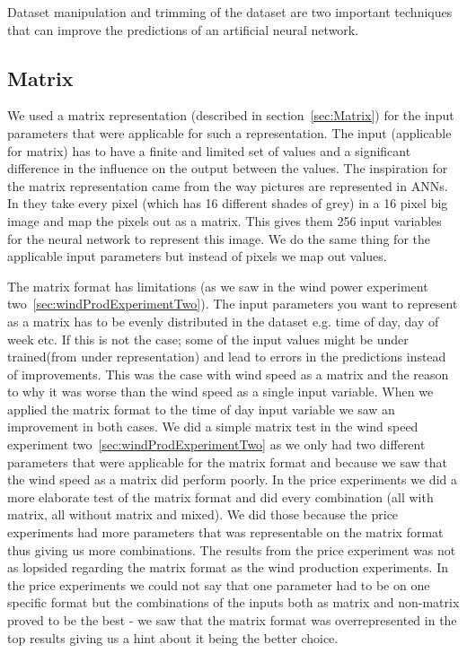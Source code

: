 Dataset manipulation and trimming of the dataset are two important techniques that can improve the predictions of an artificial neural network.
\subsection{Matrix}
We used a matrix representation (described in section~\ref{sec:Matrix}) for the input parameters that were applicable for such a representation. The input (applicable for matrix) has to have a finite and limited set of values and a significant difference in the influence on the output between the values. The inspiration for the matrix representation came from the way pictures are represented in ANNs. In \cite{knerr1992handwritten} they take every pixel (which has 16 different shades of grey) in a 16 pixel big image and map the pixels out as a matrix. This gives them 256 input variables for the neural network to represent this image. We do the same thing for the applicable input parameters but instead of pixels we map out values.

The matrix format has limitations (as we saw in the wind power experiment two~\ref{sec:windProdExperimentTwo}). The input parameters you want to represent as a matrix has to be evenly distributed in the dataset e.g. time of day, day of week etc. If this is not the case; some of the input values might be under trained(from under representation) and lead to errors in the predictions instead of improvements. This was the case with wind speed as a matrix and the reason to why it was worse than the wind speed as a single input variable. When we applied the matrix format to the time of day input variable we saw an improvement in both cases. We did a simple matrix test in the wind speed experiment two~\ref{sec:windProdExperimentTwo} as we only had two different parameters that were applicable for the matrix format and because we saw that the wind speed as a matrix did perform poorly. In the price experiments we did a more elaborate test of the matrix format and did every combination (all with matrix, all without matrix and mixed). We did those because the price experiments had more parameters that was representable on the matrix format thus giving us more combinations. The results from the price experiment was not as lopsided regarding the matrix format as the wind production experiments. In the price experiments we could not say that one parameter had to be on one specific format but the combinations of the inputs both as matrix and non-matrix proved to be the best - we saw that the matrix format was overrepresented in the top results giving us a hint about it being the better choice.

